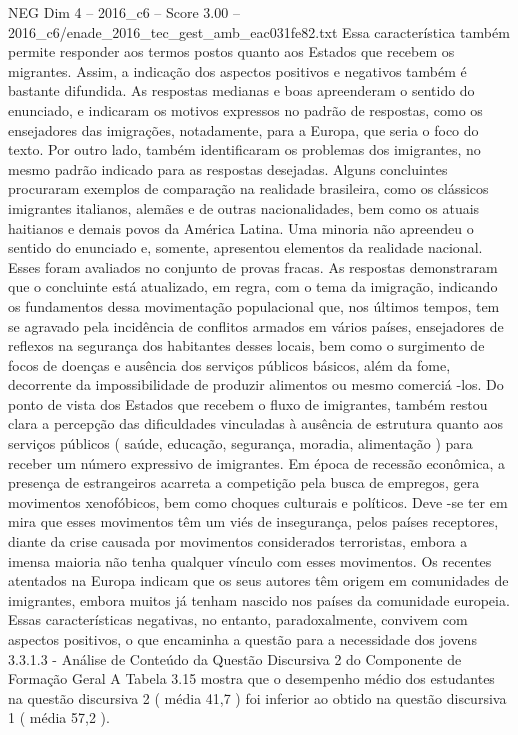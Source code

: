 \begin{textsample}{NEG Dim 4 – 2016\_c6 – Score 3.00 – 2016\_c6/enade\_2016\_tec\_gest\_amb\_eac031fe82.txt}
Essa característica também permite responder aos termos postos quanto aos Estados que recebem os migrantes.
Assim, a indicação dos aspectos positivos e negativos também é bastante difundida.
As respostas medianas e boas apreenderam o sentido do enunciado, e indicaram os motivos expressos no padrão de respostas, como os ensejadores das imigrações, notadamente, para a Europa, que seria o foco do texto.
Por outro lado, também identificaram os problemas dos imigrantes, no mesmo padrão indicado para as respostas desejadas.
Alguns concluintes procuraram exemplos de comparação na realidade brasileira, como os clássicos imigrantes italianos, alemães e de outras nacionalidades, bem como os atuais haitianos e demais povos da América Latina.
Uma minoria não apreendeu o sentido do enunciado e, somente, apresentou elementos da realidade nacional.
Esses foram avaliados no conjunto de provas fracas.
As respostas demonstraram que o concluinte está atualizado, em regra, com o tema da imigração, indicando os fundamentos dessa movimentação populacional que, nos últimos tempos, tem se agravado pela incidência de conflitos armados em vários países, ensejadores de reflexos na segurança dos habitantes desses locais, bem como o surgimento de focos de doenças e ausência dos serviços públicos básicos, além da fome, decorrente da impossibilidade de produzir alimentos ou mesmo comerciá -los.
Do ponto de vista dos Estados que recebem o fluxo de imigrantes, também restou clara a percepção das dificuldades vinculadas à ausência de estrutura quanto aos serviços públicos ( saúde, educação, segurança, moradia, alimentação ) para receber um número expressivo de imigrantes.
Em época de recessão econômica, a presença de estrangeiros acarreta a competição pela busca de empregos, gera movimentos xenofóbicos, bem como choques culturais e políticos.
Deve -se ter em mira que esses movimentos têm um viés de insegurança, pelos países receptores, diante da crise causada por movimentos considerados terroristas, embora a imensa maioria não tenha qualquer vínculo com esses movimentos.
Os recentes atentados na Europa indicam que os seus autores têm origem em comunidades de imigrantes, embora muitos já tenham nascido nos países da comunidade europeia.
Essas características negativas, no entanto, paradoxalmente, convivem com aspectos positivos, o que encaminha a questão para a necessidade dos jovens 3.3.1.3 - Análise de Conteúdo da Questão Discursiva 2 do Componente de Formação Geral A Tabela 3.15 mostra que o desempenho médio dos estudantes na questão discursiva 2 ( média 41,7 ) foi inferior ao obtido na questão discursiva 1 ( média 57,2 ).

\end{textsample}

